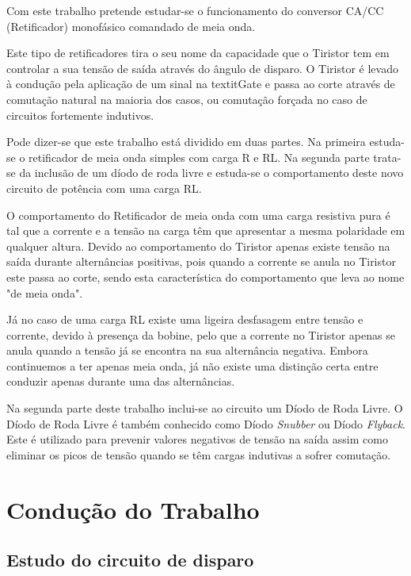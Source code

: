 \documentclass[a4paper,11pt]{article}
\numberwithin{equation}{section}
\begin{document}
Com este trabalho pretende estudar-se o funcionamento do conversor CA/CC (Retificador) monofásico comandado de meia onda.

Este tipo de retificadores tira o seu nome da capacidade que o Tiristor tem em controlar a sua tensão de saída através do ângulo de disparo. O Tiristor é levado à condução pela aplicação de um sinal na textit{Gate} e passa ao corte através de comutação natural na maioria dos casos, ou comutação forçada no caso de circuitos fortemente indutivos.

Pode dizer-se que este trabalho está dividido em duas partes. Na primeira estuda-se o retificador de meia onda simples com carga R e RL. Na segunda parte trata-se da inclusão de um díodo de roda livre e estuda-se o comportamento deste novo circuito de potência com uma carga RL.

O comportamento do Retificador de meia onda com uma carga resistiva pura é tal que a corrente e a tensão na carga têm que apresentar a mesma polaridade em qualquer altura. Devido ao comportamento do Tiristor apenas existe tensão na saída durante alternâncias positivas, pois quando a corrente se anula no Tiristor este passa ao corte, sendo esta característica do comportamento que leva ao nome "de meia onda".

Já no caso de uma carga RL existe uma ligeira desfasagem entre tensão e corrente, devido à presença da bobine, pelo que a corrente no Tiristor apenas se anula quando a tensão já se encontra na sua alternância negativa. Embora continuemos a ter apenas meia onda, já não existe uma distinção certa entre conduzir apenas durante uma das alternâncias.

Na segunda parte deste trabalho inclui-se ao circuito um Díodo de Roda Livre. O Díodo de Roda Livre é também conhecido como Díodo \textit{Snubber} ou Díodo \textit{Flyback}. Este é utilizado para prevenir valores negativos de tensão na saída assim como eliminar os picos de tensão quando se têm cargas indutivas a sofrer comutação.



\section{Condução do Trabalho}

\subsection{Estudo do circuito de disparo}
\end{document}
